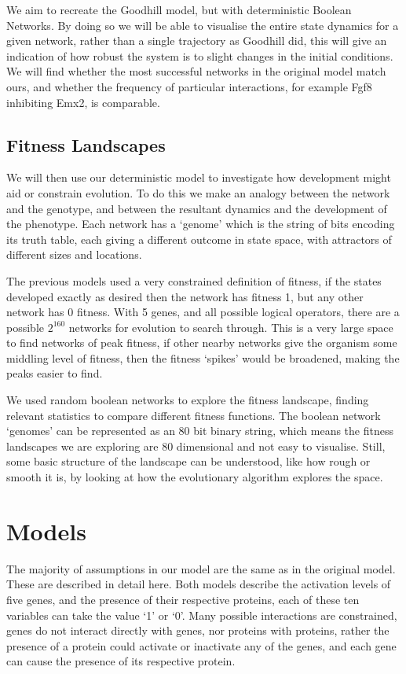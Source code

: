 \documentclass[a4paper,11pt]{article}
\begin{document}
We aim to recreate the Goodhill model, but with deterministic Boolean Networks. By doing so we will be able to visualise the entire state dynamics for a given network, rather than a single trajectory as Goodhill did, this will give an indication of how robust the system is to slight changes in the initial conditions. We will find whether the most successful networks in the original model match ours, and whether the frequency of particular interactions, for example Fgf8 inhibiting Emx2, is comparable.\par

\subsection{Fitness Landscapes}
We will then use our deterministic model to investigate how development might aid or constrain evolution. To do this we make an analogy between the network and the genotype, and between the resultant dynamics and the development of the phenotype. Each network has a `genome' which is the string of bits encoding its truth table, each giving a different outcome in state space, with attractors of different sizes and locations.\par

The previous models used a very constrained definition of fitness, if the states developed exactly as desired then the network has fitness 1, but any other network has 0 fitness. With 5 genes, and all possible logical operators, there are a possible $2^{160}$ networks for evolution to search through. This is a very large space to find networks of peak fitness, if other nearby networks give the organism some middling level of fitness, then the fitness ‘spikes’ would be broadened, making the peaks easier to find.\par

We used random boolean networks to explore the fitness landscape, finding relevant statistics to compare different fitness functions. The boolean network ‘genomes’ can be represented as an 80 bit binary string, which means the fitness landscapes we are exploring are 80 dimensional and not easy to visualise. Still, some basic structure of the landscape can be understood, like how rough or smooth it is, by looking at how the evolutionary algorithm explores the space.\par

\newpage{}
\section{Models}
The majority of assumptions in our model are the same as in the original model. These are described in detail here. Both models describe the activation levels of five genes, and the presence of their respective proteins, each of these ten variables can take the value `1' or `0'. Many possible interactions are constrained, genes do not interact directly with genes, nor proteins with proteins, rather the presence of a protein could activate or inactivate any of the genes, and each gene can cause the presence of its respective protein.\par
\end{document}
